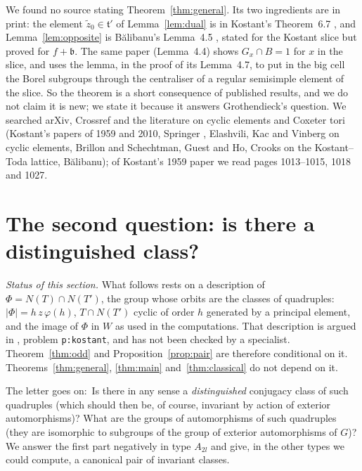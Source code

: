 \documentclass[11pt,a4paper]{amsart}
\theoremstyle{definition}
\theoremstyle{remark}
\newcommand{\q}[1]{\guillemotleft\,#1\,\guillemotright}
\begin{document}
We found no source stating Theorem~\ref{thm:general}. Its two ingredients are in print: the element $\tilde z_0 \in \mathfrak t'$ of Lemma~\ref{lem:dual} is in Kostant's Theorem~6.7 \cite{kostant}, and Lemma~\ref{lem:opposite} is B\u{a}libanu's Lemma~4.5 \cite{balibanu}, stated for the Kostant slice but proved for $f + \mathfrak b$. The same paper (Lemma~4.4) shows $G_x \cap B = 1$ for $x$ in the slice, and uses the lemma, in the proof of its Lemma~4.7, to put in the big cell the Borel subgroups through the centraliser of a regular semisimple element of the slice. So the theorem is a short consequence of published results, and we do not claim it is new; we state it because it answers Grothendieck's question. We searched arXiv, Crossref and the literature on cyclic elements and Coxeter tori (Kostant's papers of 1959 and 2010, Springer \cite{springer}, Elashvili, Kac and Vinberg on cyclic elements, Brillon and Schechtman, Guest and Ho, Crooks on the Kostant--Toda lattice, B\u{a}libanu); of Kostant's 1959 paper we read pages 1013--1015, 1018 and 1027.

\section{The second question: is there a distinguished class?}\label{sec:second}

\emph{Status of this section.} What follows rests on a description of $\Phi = N(T)\cap N(T')$, the group whose orbits are the classes of quadruples: $|\Phi| = h\,z\,\varphi(h)$, $T \cap N(T')$ cyclic of order $h$ generated by a principal element, and the image of $\Phi$ in $W$ as used in the computations. That description is argued in \cite{problems}, problem \texttt{p:kostant}, and has not been checked by a specialist. Theorem~\ref{thm:odd} and Proposition~\ref{prop:pair} are therefore conditional on it. Theorems~\ref{thm:general}, \ref{thm:main} and~\ref{thm:classical} do not depend on it.

The letter goes on: \q{Is there in any sense a \emph{distinguished} conjugacy class of such quadruples (which should then be, of course, invariant by action of exterior automorphisms)? What are the groups of automorphisms of such quadruples (they are isomorphic to subgroups of the group of exterior automorphisms of $G$)?} We answer the first part negatively in type $A_{2l}$ and give, in the other types we could compute, a canonical pair of invariant classes.
\end{document}
